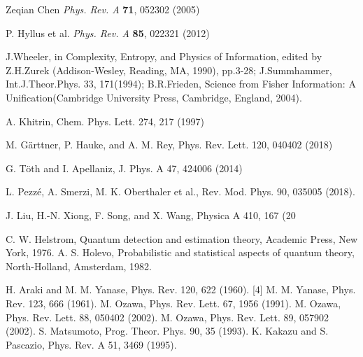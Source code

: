 \begin{thebibliography}{}
 Zeqian Chen \textit{Phys. Rev. A} \textbf{71}, 052302 (2005)

 P. Hyllus et al. \textit{Phys. Rev. A} \textbf{85}, 022321 (2012) 


 J.Wheeler, in Complexity, Entropy, and Physics of Information, edited by Z.H.Zurek (Addison-Wesley, Reading, MA, 1990), pp.3-28;
J.Summhammer, Int.J.Theor.Phys. 33, 171(1994); 
 B.R.Frieden, Science from Fisher Information: A Unification(Cambridge University Press, Cambridge, England, 2004).

 A. Khitrin, Chem. Phys. Lett. 274, 217 (1997)

 M. G\"arttner, P. Hauke, and A. M. Rey, Phys. Rev. Lett. 120, 040402 (2018)

 G. T\"oth and I. Apellaniz, J. Phys. A 47, 424006 (2014)

 L. Pezz\'e, A. Smerzi, M. K. Oberthaler et al., Rev. Mod. Phys. 90, 035005 (2018).

 J. Liu, H.-N. Xiong, F. Song, and X. Wang, Physica A 410, 167 (20


 C. W. Helstrom, Quantum detection and estimation theory, Academic Press, New York, 1976.
 A. S. Holevo, Probabilistic and statistical aspects of quantum theory, North-Holland, Amsterdam, 1982.



 H. Araki and M. M. Yanase, Phys. Rev. 120, 622 (1960). [4] M. M. Yanase, Phys. Rev. 123, 666 (1961).
 M. Ozawa, Phys. Rev. Lett. 67, 1956 (1991).
 M. Ozawa, Phys. Rev. Lett. 88, 050402 (2002).
 M. Ozawa, Phys. Rev. Lett. 89, 057902 (2002).
 S. Matsumoto, Prog. Theor. Phys. 90, 35 (1993).
 K. Kakazu and S. Pascazio, Phys. Rev. A 51, 3469
(1995).



\end{thebibliography}
